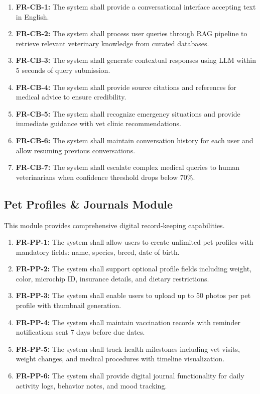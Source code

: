 \begin{enumerate}
    \item \textbf{FR-CB-1:} The system shall provide a conversational interface accepting text in English.
    \item \textbf{FR-CB-2:} The system shall process user queries through RAG pipeline to retrieve relevant veterinary knowledge from curated databases.
    \item \textbf{FR-CB-3:} The system shall generate contextual responses using LLM within 5 seconds of query submission.
    \item \textbf{FR-CB-4:} The system shall provide source citations and references for medical advice to ensure credibility.
    \item \textbf{FR-CB-5:} The system shall recognize emergency situations and provide immediate guidance with vet clinic recommendations.
    \item \textbf{FR-CB-6:} The system shall maintain conversation history for each user and allow resuming previous conversations.
    \item \textbf{FR-CB-7:} The system shall escalate complex medical queries to human veterinarians when confidence threshold drops below 70\%.
\end{enumerate}

\subsection{Pet Profiles \& Journals Module}
This module provides comprehensive digital record-keeping capabilities.

\begin{enumerate}
    \item \textbf{FR-PP-1:} The system shall allow users to create unlimited pet profiles with mandatory fields: name, species, breed, date of birth.
    \item \textbf{FR-PP-2:} The system shall support optional profile fields including weight, color, microchip ID, insurance details, and dietary restrictions.
    \item \textbf{FR-PP-3:} The system shall enable users to upload up to 50 photos per pet profile with thumbnail generation.
    \item \textbf{FR-PP-4:} The system shall maintain vaccination records with reminder notifications sent 7 days before due dates.
    \item \textbf{FR-PP-5:} The system shall track health milestones including vet visits, weight changes, and medical procedures with timeline visualization.
    \item \textbf{FR-PP-6:} The system shall provide digital journal functionality for daily activity logs, behavior notes, and mood tracking.
   
\end{enumerate}

